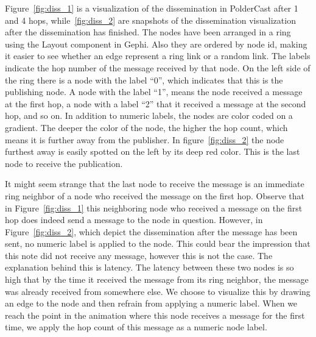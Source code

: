 Figure~\ref{fig:diss_1} is a visualization of the dissemination in
PolderCast after 1 and 4 hops, while~\ref{fig:diss_2} are snapshots of
the dissemination visualization after the dissemination has finished.
The nodes have been arranged in a ring using the Layout component in
Gephi. Also they are ordered by node id, making it easier to see whether
an edge represent a ring link or a random link. The labels indicate the
hop number of the message received by that node. On the left side of the
ring there is a node with the label ``0'', which indicates that this is
the publishing node. A node with the label ``1'', means the node
received a message at the first hop, a node with a label ``2'' that it
received a message at the second hop, and so on. In addition to numeric
labels, the nodes are color coded on a gradient. The deeper the color of
the node, the higher the hop count, which means it is further away from
the publisher. In figure~\ref{fig:diss_2} the node furthest away is
easily spotted on the left by its deep red color. This is the last node
to receive the publication.

It might seem strange that the last node to receive the message is an
immediate ring neighbor of a node who received the message on the first
hop. Observe that in Figure~\ref{fig:diss_1} this neighboring node who
received a message on the first hop does indeed send a message to the
node in question. However, in Figure~\ref{fig:diss_2}, which depict the
dissemination after the message has been sent, no numeric label is
applied to the node. This could bear the impression that this note did
not receive any message, however this is not the case. The explanation
behind this is latency. The latency between these two nodes is so high
that by the time it received the message from its ring neighbor, the
message was already received from somewhere else. We choose to visualize
this by drawing an edge to the node and then refrain from applying a
numeric label. When we reach the point in the animation where this node
receives a message for the first time, we apply the hop count of this
message as a numeric node label.

